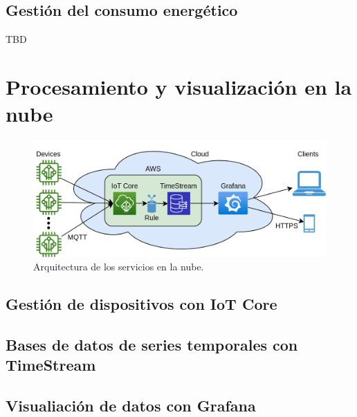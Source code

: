 \subsection{Gestión del consumo energético}
TBD
\section{Procesamiento y visualización en la nube}

\begin{figure}[h]
	\centering
	\includegraphics[scale=0.22]{./Figures/cc_diagram.png}
	\caption{Arquitectura de los servicios en la nube.}
	\label{fig:cc_diagram}
\end{figure}

\subsection{Gestión de dispositivos con IoT Core}
\label{subsection3_3_1}
\subsection{Bases de datos de series temporales con TimeStream}
\subsection{Visualiación de datos con Grafana}




